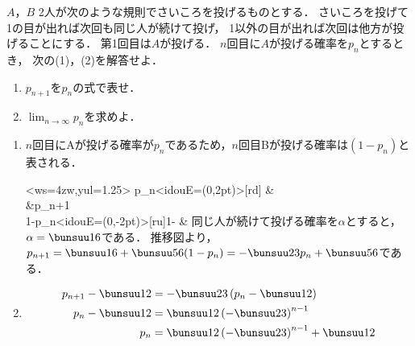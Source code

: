 \begin{problem}
$A$，$B$ 2人が次のような規則でさいころを投げるものとする．
さいころを投げて1の目が出れば次回も同じ人が続けて投げ，
1以外の目が出れば次回は他方が投げることにする．
第1回目は$A$が投げる．
$n$回目に$A$が投げる確率を$p_n$とするとき，
次の(1)，(2)を解答せよ．
\begin{enumerate}
\item $p_{n+1}$を$p_n$の式で表せ．
\item $\displaystyle\lim_{n\to\infty}p_n$を求めよ．
\end{enumerate}
\end{problem}

\begin{enumerate}
  \item $n$回目にAが投げる確率が$p_n$であるため，$n$回目Bが投げる確率は$(1-p_n)$と表される．

  \EMxymatrix<ws=4zw,yul=1.25\baselineskip>{%
    p_n\ar<idouE={(0,2pt)}>[rd]{\alpha} & \\
    &p_{n+1} \\
    1-p_n\ar<idouE={(0,-2pt)}>[ru]{1-\alpha} &
  }
  同じ人が続けて投げる確率を$\alpha$とすると，$\alpha = \bunsuu16$である．
  推移図より，$p_{n+1} = \bunsuu16 + \bunsuu56(1-p_n) = -\bunsuu23p_n + \bunsuu56$である．

  \item
  \begin{align*}
    p_{n+1} - \bunsuu12 &= -\bunsuu23\left(p_n - \bunsuu12\right) \\
    p_n - \bunsuu12 &= \bunsuu12\left(-\bunsuu23\right)^{n-1}\\
    p_n &= \bunsuu12\left(-\bunsuu23\right)^{n-1} + \bunsuu12
  \end{align*}
\end{enumerate}

